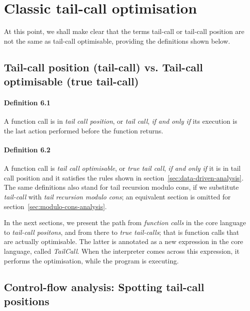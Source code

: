\documentclass[diploma]{softlab-thesis}
\begin{document}

\section{Classic tail-call optimisation}
\label{sec:classic-tco-analysis}

At this point, we shall make clear that the terms tail-call or tail-call position are not the same 
as tail-call optimisable, providing the definitions shown below.

\subsection{Tail-call position (tail-call) vs. Tail-call optimisable (true tail-call)}

\paragraph{Definition 6.1}
A function call is in \textit{tail call position}, or \textit{tail call}, \textit{if and only if} its execution is the last action 
performed before the function returns.

\paragraph{Definition 6.2}
A function call is \textit{tail call optimisable}, or \textit{true tail call}, \textit{if and only if} it is in tail call position and it satisfies the rules shown in 
section~\ref{sec:data-driven-analysis}.\\

The same definitions also stand for tail recursion modulo cons, if we substitute \textit{tail-call} with 
\textit{tail recursion modulo cons}; an equivalent section is omitted for section~\ref{sec:modulo-cons-analysis}.

In the next sections, we present the path from \textit{function calls} in the core language to \textit{tail-call positons}, 
and from there to \textit{true tail-calls}; that is function calls that are actually optimisable. The latter is annotated as a new 
expression in the core language, called \textit{TailCall}. When the interpreter comes across this expression, it performs the 
optimisation, while the program is executing.

\subsection{Control-flow analysis: Spotting tail-call positions}
\end{document}
